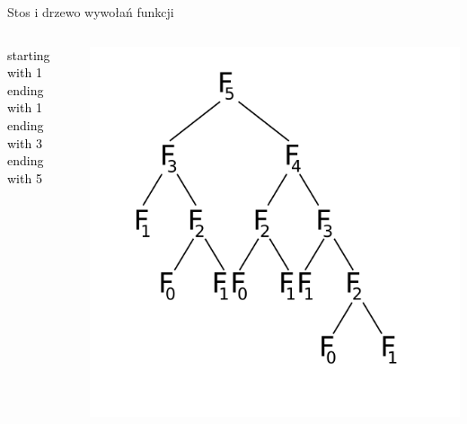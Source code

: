 \begin{frame}{Stos i drzewo wywołań funkcji}
\begin{columns}
\begin{column}{0.25\textwidth}
            \textcolor{black}{starting with 1}\\
            \textcolor{black}{ending with 1}\\
            \textcolor{black}{ending with 3}\\
            \textcolor{black}{ending with 5}\\
        \end{column}
        \begin{column}{0.5\textwidth}
            \includegraphics[width=\textwidth]{recursion/graphics/fibonacci_black.png}
        \end{column}
    \end{columns}
\end{frame}
